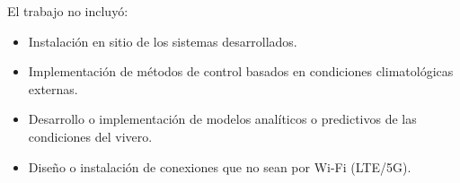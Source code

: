 El trabajo no incluyó:
\begin{itemize}
	\item Instalación en sitio de los sistemas desarrollados.
	\item Implementación de métodos de control basados en condiciones climatológicas externas.
	\item Desarrollo o implementación de modelos analíticos o predictivos de las condiciones del vivero.
	\item Diseño o instalación de conexiones que no sean por Wi-Fi (LTE/5G). 
	
\end{itemize}